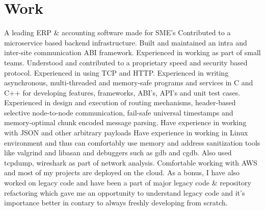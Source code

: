 \documentclass{../include/resume_v01}
\begin{document}
\medskip

\bigskip

\section{Work}


\par {A leading ERP \& accounting software made for SME's}
\medskip
\workitems
{Contributed to a microservice based backend infrastructure. Built and maintained an intra and inter-site communication ABI framework. Experienced in working as part of small teams. Understood and contributed to a proprietary speed and security based protocol. Experienced in using TCP and HTTP.}
{Experienced in writing asynchronous, multi-threaded and memory-safe programs and services in C and C++ for developing features, frameworks, ABI's, API's and unit test cases. Experienced in design and execution of routing mechanisms, header-based selective node-to-node communication, fail-safe universal timestamps and memory-optimal chunk encoded message parsing. Have experience in working with JSON and other arbitrary payloads}
{Have experience in working in Linux environment and thus can comfortably use memory and address sanitization tools like valgrind and libasan and debuggers such as gdb and cgdb. Also used tcpdump, wireshark as part of network analysis. Comfortable working with AWS and most of my projects are deployed on the cloud.}
{As a bonus, I have also worked on legacy code and have been a part of major legacy code \& repository refactoring which gave me an opportunity to understand legacy code and it's importance better in contary to always freshly developing from scratch.}
\end{document}
